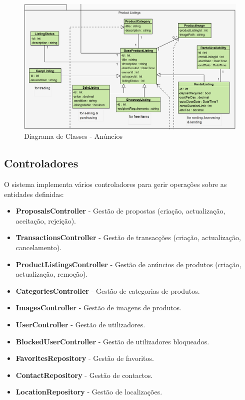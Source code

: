\documentclass[a4paper, 12pt]{article} %
\begin{document}
\begin{figure}[ht]
	\centering
	\includegraphics[width=\textwidth]{../images/class-diagram-listings.png}
	\caption{Diagrama de Classes - Anúncios}
	\label{fig:class_diagram_listings}
\end{figure}

\newpage
\subsection{Controladores}
O sistema implementa vários controladores para gerir operações sobre as entidades definidas:
\begin{itemize}
	\item \textbf{ProposalsController} - Gestão de propostas (criação, actualização, aceitação, rejeição).
	\item \textbf{TransactionsController} - Gestão de transacções (criação, actualização, cancelamento).
	\item \textbf{ProductListingsController} - Gestão de anúncios de produtos (criação, actualização, remoção).
	\item \textbf{CategoriesController} - Gestão de categorias de produtos.
	\item \textbf{ImagesController} - Gestão de imagens de produtos.
	\item \textbf{UserController} - Gestão de utilizadores.
	\item \textbf{BlockedUserController} - Gestão de utilizadores bloqueados.
	\item \textbf{FavoritesRepository} - Gestão de favoritos.
	\item \textbf{ContactRepository} - Gestão de contactos.
	\item \textbf{LocationRepository} - Gestão de localizações.
\end{itemize}
\end{document}
